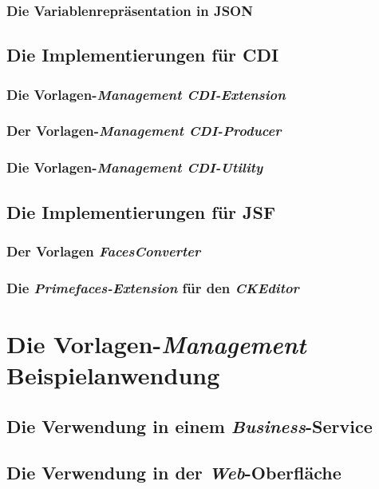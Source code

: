 \subsubsection{Die Variablenrepräsentation in JSON}


\subsection{Die Implementierungen für CDI}

\subsubsection{Die Vorlagen-\emph{Management CDI-Extension}}

\subsubsection{Der Vorlagen-\emph{Management CDI-Producer}}

\subsubsection{Die Vorlagen-\emph{Management CDI-Utility}}


\subsection{Die Implementierungen für JSF}

\subsubsection{Der Vorlagen \emph{FacesConverter}}

\subsubsection{Die \emph{Primefaces-Extension} für den \emph{CKEditor}}


\section{Die Vorlagen-\emph{Management} Beispielanwendung}
\subsection{Die Verwendung in einem \emph{Business}-Service}
\subsection{Die Verwendung in der \emph{Web}-Oberfläche}